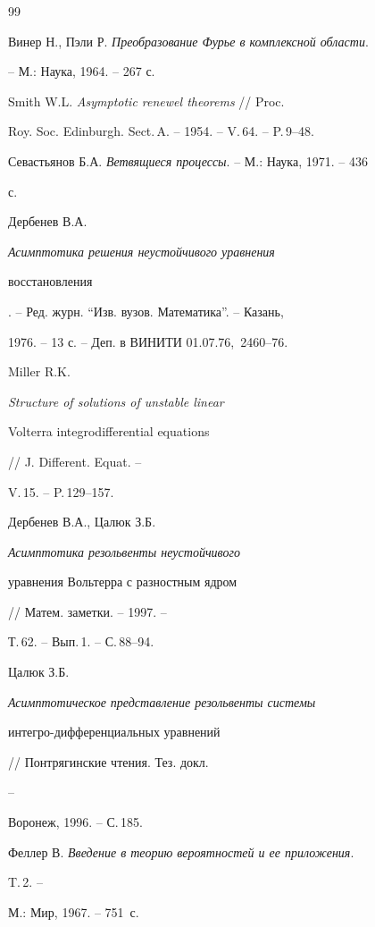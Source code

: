 \begin{thebibliography}{99} 


 




Винер Н., Пэли Р. {\em Преобразование Фурье в комплексной области}. 


-- М.: Наука, 1964. -- 267 с. 




Smith W.L. {\em Asymptotic renewel theorems} // Proc.


Roy. Soc. Edinburgh. Sect.\,A. -- 1954. -- V.\,64. -- P.\,9--48. 




Севастьянов Б.А. {\em Ветвящиеся процессы}. -- М.: Наука, 1971. -- 436 


с. 




Дербенев В.А. {\em Асимптотика решения неустойчивого уравнения 


восстановления}. -- Ред. журн. ``Изв. вузов. Математика''. -- Казань,


1976. -- 13 с. -- Деп. в ВИНИТИ 01.07.76, \No\,2460--76. 




Miller R.K. {\em Structure of solutions of unstable linear 


Volterra integrodifferential equations} // J. Different. Equat. -- 


V.\,15. -- P.\,129--157. 




Дербенев В.А., Цалюк З.Б. {\em Асимптотика резольвенты неустойчивого 


уравнения Вольтерра с разностным ядром} // Матем. заметки. -- 1997. -- 


Т.\,62. -- Вып.\,1. -- С.\,88--94. 




Цалюк З.Б. {\em Асимптотическое представление резольвенты системы 


интегро-диф\-фе\-рен\-ци\-альных уравнений} // Понтрягинские чтения. Тез. докл. 


-- 


Воронеж, 1996. -- С.\,185. 




Феллер В. {\em Введение в теорию вероятностей и ее приложения}. 


T.\,2. -- 


М.: Мир, 1967. -- 751~с. 


 


\end{thebibliography} 


 


\vskip 2cm 


 






 


\label{end} 


 


 


